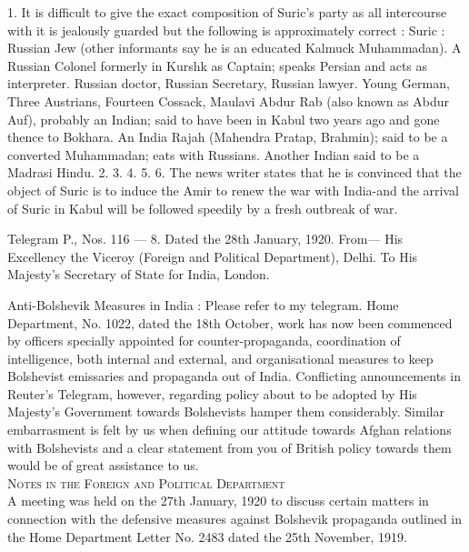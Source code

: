 1. It is difficult to give the exact composition of Suric’s party as all intercourse with it is jealously guarded but the following is approximately correct : Suric : Russian Jew (other informants say he is an educated Kalmuck Muhammadan). A Russian Colonel formerly in Kurshk as Captain; speaks Persian and acts as interpreter. Russian doctor, Russian Secretary, Russian lawyer. Young German, Three Austrians, Fourteen Cossack, Maulavi Abdur Rab (also known as Abdur Auf), probably an Indian; said to have been in Kabul two years ago and gone thence to Bokhara. An India Rajah (Mahendra Pratap, Brahmin); said to be a converted Muhammadan; eats with Russians. Another Indian said to be a Madrasi Hindu. 
2. 
3.
4. 
5. 
6. The news writer states that he is convinced that the object of Suric is to induce the Amir to renew the war with India-and the arrival of Suric in Kabul will be followed speedily by a fresh outbreak of war. 

Telegram P., Nos. 116 — 8. Dated the 28th January, 1920.
From— His Excellency the Viceroy 
(Foreign and Political Department), Delhi. 
To His Majesty's Secretary of State for India, London. 

Anti-Bolshevik Measures in India : Please refer to my telegram. Home Department, No. 1022, dated the 18th October, work has now been commenced by officers specially appointed for counter-propaganda, coordination of intelligence, both internal and external, and organisational measures to keep Bolshevist emissaries and propaganda out of India. Conflicting announcements in Reuter’s Telegram, however, regarding policy about to be adopted by His Majesty's Government towards Bolshevists hamper them considerably. Similar embarrasment is felt by us when defining our attitude towards Afghan relations with Bolshevists and a clear statement from you of British policy towards them would be of great assistance to us.\\ 

\textsc{Notes in the Foreign and Political Department }\\

A meeting was held on the 27th January, 1920 to discuss certain matters in connection with the defensive measures against Bolshevik propaganda outlined in the Home Department Letter No. 2483 dated the 25th November, 1919. 

